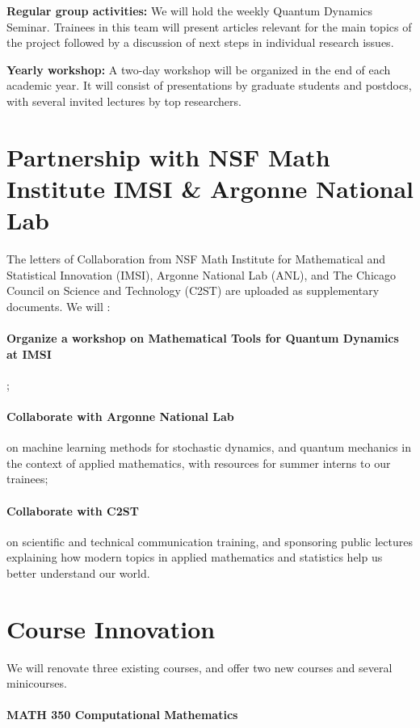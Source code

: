\documentclass[11pt]{NSFamsart}
\newcommand{\bfparagraph}[1]{\paragraph{\textbf{\textup{#1}}}}
\begin{document}
\smallskip




\noindent \textbf{Regular group activities:} We will hold   the weekly Quantum Dynamics Seminar.      Trainees in this team will present articles relevant for the main topics of the
project followed by a discussion of    next steps in   individual research issues.


 

\noindent \textbf{Yearly workshop:} A two-day workshop will be organized in the end of each academic year.  It will consist   of presentations by graduate
students and postdocs, with several invited lectures 
by top researchers.  



\section{Partnership with NSF Math Institute IMSI \& Argonne National Lab}

The letters of Collaboration from NSF Math Institute for Mathematical and Statistical Innovation (IMSI), Argonne National Lab (ANL), and 
The Chicago Council on Science and Technology (C2ST) are uploaded as supplementary documents.  We will :\\
\bfparagraph{Organize a workshop on Mathematical Tools for Quantum Dynamics   at IMSI};   
\bfparagraph{Collaborate with Argonne National Lab} on machine learning methods for stochastic dynamics, and quantum mechanics in the context of applied mathematics, with resources for summer interns to our trainees;  
\bfparagraph{Collaborate with C2ST} on scientific and technical communication training, and sponsoring public lectures explaining how modern topics in applied mathematics and statistics help us better understand our world.
 


\section{Course Innovation}
We will renovate three existing courses,  
and offer two new courses and several minicourses.

\bfparagraph{MATH 350 Computational Mathematics} 
\end{document}
